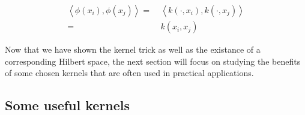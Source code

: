 \begin{equation*}
  \begin{aligned}
    \left<\phi(x_i), \phi(x_j)\right> =\ &\left<k\left(\cdot, x_i\right), k\left(\cdot, x_j\right)\right>\\
    =\ &k(x_i, x_j)
  \end{aligned}
\end{equation*}

Now that we have shown the kernel trick as well as the existance of a corresponding Hilbert space, the next section will focus on studying the benefits of some chosen kernels that are often used in practical applications.

\subsection {Some useful kernels}

